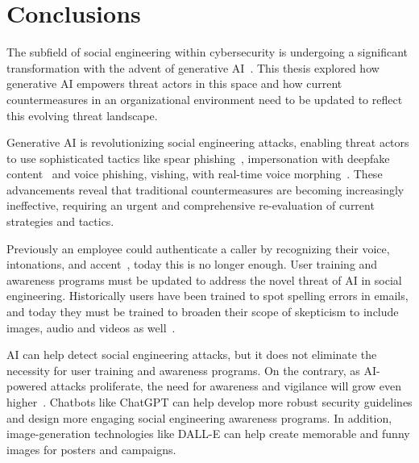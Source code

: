 \chapter{Conclusions\label{chapter:conclusions}}
\begin{comment}
Muistuta tutkimuskysymys
Tärkeimmät tulokset ja perusteet
Incident costs, numbers = impact
suositukset
\end{comment}

The subfield of social engineering within cybersecurity is undergoing a significant transformation with the advent of generative AI~\citep{fakhouri_AI_Driven_Solutions_SE_Attacks_2024}. This thesis explored how generative AI empowers threat actors in this space and how current countermeasures in an organizational environment need to be updated to reflect this evolving threat landscape.

Generative AI is revolutionizing social engineering attacks, enabling threat actors to use sophisticated tactics like spear phishing~\citep{basit_Comprehensive_Survey_AI_Phishing_Detection_2021}, impersonation with deepfake content~\citep{mirsky_Creation_Detection_Deepfakes_2021} and voice phishing, vishing, with real-time voice morphing~\citep{doan_BTSE_Audio_Deepfake_Detection_2023}. These advancements reveal that traditional countermeasures are becoming increasingly ineffective, requiring an urgent and comprehensive re-evaluation of current strategies and tactics.

Previously an employee could authenticate a caller by recognizing their voice, intonations, and accent~\citep{mitnick_The_Art_of_Deception_2003}, today this is no longer enough. User training and awareness programs must be updated to address the novel threat of AI in social engineering. Historically users have been trained to spot spelling errors in emails, and today they must be trained to broaden their scope of skepticism to include images, audio and videos as well~\citep{mirsky_Creation_Detection_Deepfakes_2021}.

AI can help detect social engineering attacks, but it does not eliminate the necessity for user training and awareness programs. On the contrary, as AI-powered attacks proliferate, the need for awareness and vigilance will grow even higher~\citep{fakhouri_AI_Driven_Solutions_SE_Attacks_2024}. Chatbots like ChatGPT can help develop more robust security guidelines and design more engaging social engineering awareness programs. In addition, image-generation technologies like DALL-E can help create memorable and funny images for posters and campaigns.

